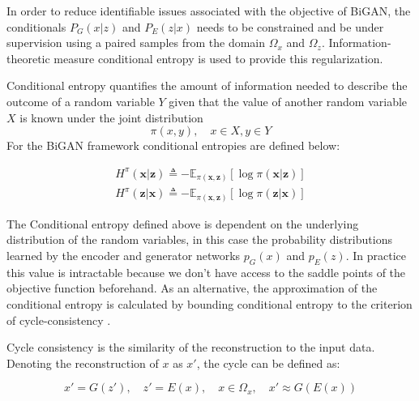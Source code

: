 {In order to reduce identifiable issues associated with the objective of BiGAN, the
conditionals $P_{G}(x|z)$ and $P_{E}(z|x)$ needs to be constrained and be under supervision using a
paired samples from the domain $\Omega_{x}$ and $\Omega_{z}$. Information-theoretic measure
conditional entropy is used to provide this regularization. 

Conditional entropy quantifies the amount of information needed to describe the outcome of a random variable 
$Y$ given that the value of another random variable $X$ is known \cite{Cover:2006:EIT:1146355}  under the joint distribution 
$$
\pi(x ,y ) ,\quad x \in X , y \in Y
$$ 
For the BiGAN framework conditional entropies are defined below:

\begin{align}
    H^{\pi}(\boldsymbol{x} | \boldsymbol{z}) \triangleq-\mathbb{E}_{\pi(\boldsymbol{x}, \boldsymbol{z})}[\log \pi(\boldsymbol{x} | \boldsymbol{z})] \\[5pt]
    H^{\pi}(\boldsymbol{z} | \boldsymbol{x}) \triangleq-\mathbb{E}_{\pi(\boldsymbol{x}, \boldsymbol{z})}[\log \pi(\boldsymbol{z} | \boldsymbol{x})] 
\end{align}

The Conditional entropy defined above is dependent on the underlying distribution of the random
variables, in this case the probability distributions learned by the encoder and generator networks $p_{G}(x)$ and
$p_{E}(z)$. In practice this value is intractable because we don't have access to the saddle points
of the objective function beforehand. As an alternative, the approximation of the conditional
entropy is calculated by bounding conditional entropy to the criterion of cycle-consistency \cite{Zhu2017UnpairedIT}.

Cycle consistency is the similarity of the reconstruction to the input data. Denoting the
reconstruction of $x$ as $x'$, the cycle can be defined as: 

\begin{equation}
  x' = G(z'), \quad z' = E(x),\quad x \in \Omega_{x},\quad x' \approx G(E(x)) 
\end{equation}

}
